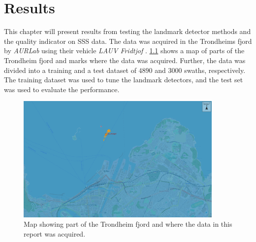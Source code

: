 \chapter{Results}

This chapter will present results from testing the landmark detector methods and the quality indicator on SSS data. The data was acquired in the Trondheims fjord by \textit{AURLab} using their vehicle \textit{LAUV Fridtjof} \cite{LAUVNTNU}. \cref{fig:neptus_screenshot} shows a map of parts of the Trondheim fjord and marks where the data was acquired. Further, the data was divided into a training and a test dataset of $4890$ and $3000$ swaths, respectively. The training dataset was used to tune the landmark detectors, and the test set was used to evaluate the performance. 

\begin{figure} [h]%
  \centering
  \includegraphics[width=0.9\textwidth]{figures/neptus_screenshot.png}
  \caption{Map showing part of the Trondheim fjord and where the data in this report was acquired.}
  \label{fig:neptus_screenshot}
\end{figure}

